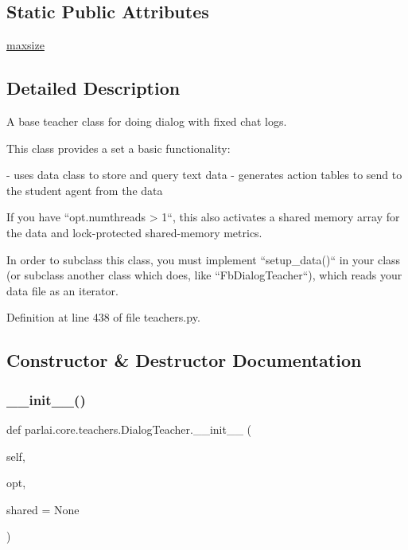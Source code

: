 \subsection*{Static Public Attributes}
\begin{DoxyCompactItemize}
\item 
\hyperlink{classparlai_1_1core_1_1teachers_1_1DialogTeacher_aa0637cf3392baf2e9c965de7ffc812ac}{maxsize}
\end{DoxyCompactItemize}


\subsection{Detailed Description}
\begin{DoxyVerb}A base teacher class for doing dialog with fixed chat logs.

This class provides a set a basic functionality:

- uses data class to store and query text data
- generates action tables to send to the student agent from the data

If you have ``opt.numthreads > 1``, this also activates a shared memory
array for the data and lock-protected shared-memory metrics.

In order to subclass this class, you must implement ``setup_data()`` in
your class (or subclass another class which does, like
``FbDialogTeacher``), which reads your data file as an iterator.
\end{DoxyVerb}
 

Definition at line 438 of file teachers.\+py.



\subsection{Constructor \& Destructor Documentation}
\mbox{\label{classparlai_1_1core_1_1teachers_1_1DialogTeacher_a9385b9ae914ef84be6b54107811b202b}} 
\subsubsection{\texorpdfstring{\+\_\+\+\_\+init\+\_\+\+\_\+()}{\_\_init\_\_()}}
{\footnotesize\ttfamily def parlai.\+core.\+teachers.\+Dialog\+Teacher.\+\_\+\+\_\+init\+\_\+\+\_\+ (\begin{DoxyParamCaption}\item[{}]{self,  }\item[{}]{opt,  }\item[{}]{shared = {\ttfamily None} }\end{DoxyParamCaption})}



